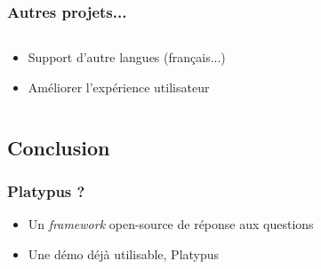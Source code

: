 \begin{frame}
    \frametitle{Autres projets...}
    
    \begin{columns}
    \begin{column}{0.55\textwidth}
        \begin{itemize}
        \item Support d'autre langues (français...)
        \item Améliorer l'expérience utilisateur
        \end{itemize}
    \end{column}
    \begin{column}{0.5\textwidth}
    \end{column}
    \end{columns}
\end{frame}

\subsection{Conclusion}

\begin{frame}
    \frametitle{Platypus ?}

    \begin{itemize}
        \item Un \textit{framework} open-source de réponse aux questions
        \item Une démo déjà utilisable, \alert{Platypus}
    \end{itemize}
\end{frame}


